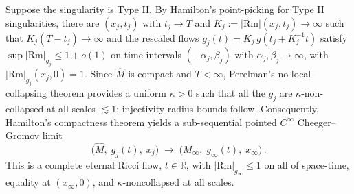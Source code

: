 \documentclass[11pt]{amsart}
\theoremstyle{plain}
\numberwithin{equation}{section}
\theoremstyle{definition}
\theoremstyle{remark}
\begin{document}
Suppose the singularity is Type II. By Hamilton's point-picking for Type II singularities, there are $( x_j, t_j )$ with $t_j \to T$ and $K_j := | \mathrm{Rm} | ( x_j, t_j ) \to \infty$ such that $K_j ( T - t_j ) \to \infty$ and the rescaled flows $g_j (t) = K_j\, g ( t_j + K_j^{-1} t )$ satisfy $\sup | \mathrm{Rm} |_{g_j} \leq 1 + o(1)$ on time intervals $( - \alpha_j, \beta_j )$ with $\alpha_j, \beta_j \to \infty$, with $| \mathrm{Rm} |_{g_j} ( x_j, 0 ) = 1$. Since $\widehat{M}$ is compact and $T < \infty$, Perelman's no-local-collapsing theorem provides a uniform $\kappa > 0$ such that all the $g_j$ are $\kappa$-non-collapsed at all scales $\lesssim 1$; injectivity radius bounds follow. Consequently, Hamilton's compactness theorem yields a sub-sequential pointed $C^\infty$ Cheeger--Gromov limit
\[
\big( \widehat{M}, \; g_j (t), \; x_j \big) \;\longrightarrow\; \big( M_\infty, \; g_\infty (t), \; x_\infty \big) \,.
\]
This is a complete {eternal} Ricci flow, $t \in \mathbb{R}$, with $| \mathrm{Rm} |_{g_\infty} \leq 1$ on all of space-time, equality at $( x_\infty, 0 )$, and $\kappa$-noncollapsed at all scales.

	
\end{document}
